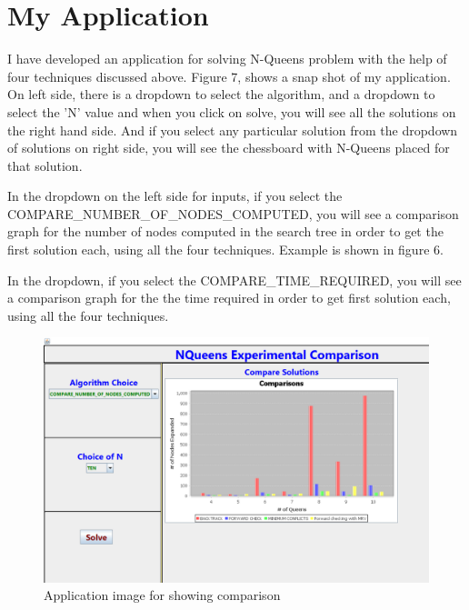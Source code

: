 \documentclass[conference]{IEEEtran}
\begin{document}

%
%
%

\section{My Application}

I have developed an application for solving N-Queens problem with the help of four techniques discussed above.
Figure 7, shows a snap shot of my application. On left side, there is a dropdown to select the algorithm, and a dropdown to select the 'N' value and when you click on solve, you will see all the solutions on the right hand side. And if you select any particular solution from the dropdown of solutions on right side, you will see the chessboard with N-Queens placed for that solution.

\par In the dropdown on the left side for inputs, if you select the COMPARE\_NUMBER\_OF\_NODES\_COMPUTED, you will see a comparison graph for the number of nodes computed in the search tree in order to get the first solution each, using all the four techniques. Example is shown in figure 6.

\par  In the dropdown, if you select the COMPARE\_TIME\_REQUIRED, you will see a comparison graph for the the time required in order to get first solution each, using all the four techniques.


\begin{figure}
\includegraphics[scale=0.27]{N10nodesComputedComparison.png}
\caption{Application image for showing comparison}
\label{Figure9}
\end{figure}
\end{document}
